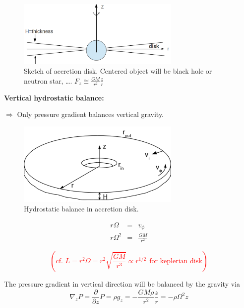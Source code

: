 \begin{figure}[!htbp]
   \centering
   \includegraphics[width=0.7\textwidth]{HighEnergy/disk}
   \caption{Sketch of accretion disk. Centered object will be black hole or neutron star, \ldots. $F_{z}\cong \frac{GM}{r^{2}} \frac{z}{r}$}
\label{fig:disk}
\end{figure}

\textbf{Vertical hydrostatic balance:}

$\Rightarrow$ Only pressure gradient balances vertical gravity.

\begin{figure}[!htbp]
   \centering
   \includegraphics[width=0.7\textwidth]{HighEnergy/accretion}
   \caption{Hydrostatic balance in accretion disk.}
\label{fig:accretion}
\end{figure}

\begin{eqnarray}
   r \Omega &=& v_{\phi} \\
   r \Omega^{2} &=& \frac{GM}{r^{2}}
\end{eqnarray}

\textcolor{red}{
\begin{equation}
   (\text{cf. }L=r^{2}\Omega = r^{2} \sqrt{\frac{GM}{r^{3}}} \propto r^{1/2} ~~\text{for keplerian disk})
\end{equation}
}

The pressure gradient in vertical direction will be balanced by the gravity via
\begin{equation}
   \nabla_{z}P = \frac{\partial}{\partial z}P = \rho g_{z} = -\frac{GM\rho}{r^{2}} \frac{z}{r} = -\rho \Omega^{2}z
\end{equation}

